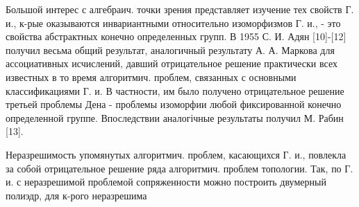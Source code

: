 \documentclass[10pt]{article}
\begin{document}
Большой интерес с алгебраич. точки зрения представляет изучение тех свойств Г. и., к-рые оказываются инвариантными относительно изоморфизмов Г. и., - это свойства абстрактных конечно определенных групп. В 1955 С. И. Адян [10]-[12] получил весьма общий результат, аналогичный результату А. А. Маркова для ассоциативных исчислений, давший отрицательное решение практически всех известных в то время алгоритмич. проблем, связанных с основными классификациями Г. и. В частности, им было получено отрицательное решение третьей проблемы Дена - проблемы изоморфии любой фиксированной конечно определенной группе. Впоследствии аналогічные результаты получил М. Рабин [13].



Неразрешимость упомянутых алгоритмич. проблем, касающихся Г. и., повлекла за собой отрицательное решение ряда алгоритмич. проблем топологии. Так, по Г. и. с неразрешимой проблемой сопряженности можно построить двумерный полиэдр, для к-рого неразрешима
\end{document}
